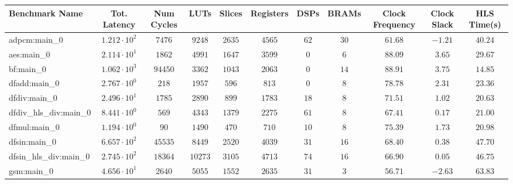 \begin{tabular}{|l|c|c|c|c|c|c|c|c|c|c|}
\hline
Benchmark Name          & Tot. Latency           & Num Cycles & LUTs      & Slices    & Registers & DSPs    & BRAMs   & Clock Frequency & Clock Slack & HLS Time(s) \\
\hline
adpcm:main\_0           & $ 1.212 \cdot 10^{2} $ & $ 7476   $ & $ 9248  $ & $ 2635  $ & $ 4565  $ & $ 62  $ & $ 30  $ & $ 61.68       $ & $ -1.21   $ & $ 40.24   $ \\
aes:main\_0             & $ 2.114 \cdot 10^{1} $ & $ 1862   $ & $ 4991  $ & $ 1647  $ & $ 3599  $ & $ 0   $ & $ 6   $ & $ 88.09       $ & $ 3.65    $ & $ 29.67   $ \\
bf:main\_0              & $ 1.062 \cdot 10^{3} $ & $ 94450  $ & $ 3362  $ & $ 1043  $ & $ 2063  $ & $ 0   $ & $ 14  $ & $ 88.91       $ & $ 3.75    $ & $ 14.85   $ \\
dfadd:main\_0           & $ 2.767 \cdot 10^{0} $ & $ 218    $ & $ 1957  $ & $ 596   $ & $ 813   $ & $ 0   $ & $ 8   $ & $ 78.78       $ & $ 2.31    $ & $ 23.36   $ \\
dfdiv:main\_0           & $ 2.496 \cdot 10^{1} $ & $ 1785   $ & $ 2890  $ & $ 899   $ & $ 1783  $ & $ 18  $ & $ 8   $ & $ 71.51       $ & $ 1.02    $ & $ 20.63   $ \\
dfdiv\_hls\_div:main\_0 & $ 8.441 \cdot 10^{0} $ & $ 569    $ & $ 4343  $ & $ 1379  $ & $ 2275  $ & $ 61  $ & $ 8   $ & $ 67.41       $ & $ 0.17    $ & $ 21.00   $ \\
dfmul:main\_0           & $ 1.194 \cdot 10^{0} $ & $ 90     $ & $ 1490  $ & $ 470   $ & $ 710   $ & $ 10  $ & $ 8   $ & $ 75.39       $ & $ 1.73    $ & $ 20.98   $ \\
dfsin:main\_0           & $ 6.657 \cdot 10^{2} $ & $ 45535  $ & $ 8449  $ & $ 2520  $ & $ 4039  $ & $ 31  $ & $ 16  $ & $ 68.40       $ & $ 0.38    $ & $ 47.70   $ \\
dfsin\_hls\_div:main\_0 & $ 2.745 \cdot 10^{2} $ & $ 18364  $ & $ 10273 $ & $ 3105  $ & $ 4713  $ & $ 74  $ & $ 16  $ & $ 66.90       $ & $ 0.05    $ & $ 46.75   $ \\
gsm:main\_0             & $ 4.656 \cdot 10^{1} $ & $ 2640   $ & $ 5055  $ & $ 1552  $ & $ 2635  $ & $ 31  $ & $ 3   $ & $ 56.71       $ & $ -2.63   $ & $ 63.83   $ \\

\end{tabular}
